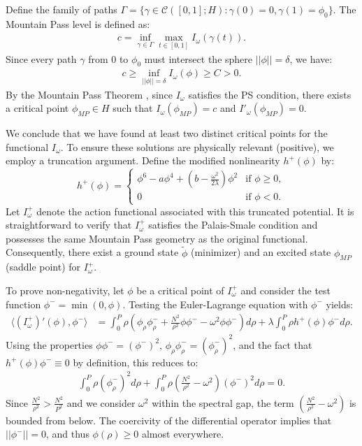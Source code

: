 \documentclass[12pt]{article}
\begin{document}
	Define the family of paths $\Gamma = \{ \gamma \in \mathcal{C}([0,1]; H) : \gamma(0)=0, \gamma(1)=\phi_0 \}$. The Mountain Pass level is defined as:
	\begin{align}
		c = \inf_{\gamma \in \Gamma} \max_{t \in [0,1]} I_\omega(\gamma(t)).
	\end{align}
	Since every path $\gamma$ from $0$ to $\phi_0$ must intersect the sphere $||\phi||=\delta$, we have:
	\begin{align}
		c \geq \inf_{||\phi||=\delta} I_\omega(\phi) \geq C > 0.
	\end{align}
	By the Mountain Pass Theorem \cite{Jabri, PR}, since $I_\omega$ satisfies the PS condition, there exists a critical point $\phi_{MP} \in H$ such that $I_\omega(\phi_{MP}) = c$ and $I'_\omega(\phi_{MP}) = 0$.
	
We conclude that we have found at least two distinct critical points for the functional $I_\omega$. To ensure these solutions are physically relevant (positive), we employ a truncation argument. Define the modified nonlinearity $h^+(\phi)$ by:
\begin{equation}
    h^+(\phi) = \begin{cases} 
    \phi^6 - a\phi^4 + (b - \frac{\omega^2}{2\lambda})\phi^2 & \text{if } \phi \geq 0, \\
    0 & \text{if } \phi < 0.
    \end{cases}
\end{equation}
Let $I_\omega^+$ denote the action functional associated with this truncated potential. It is straightforward to verify that $I_\omega^+$ satisfies the Palais-Smale condition and possesses the same Mountain Pass geometry as the original functional. Consequently, there exist a ground state $\tilde{\phi}$ (minimizer) and an excited state $\phi_{MP}$ (saddle point) for $I_\omega^+$.

To prove non-negativity, let $\phi$ be a critical point of $I_\omega^+$ and consider the test function $\phi^- = \min(0, \phi)$. Testing the Euler-Lagrange equation with $\phi^-$ yields:
\begin{align}
    \langle (I_\omega^+)'(\phi), \phi^- \rangle &= \int_0^P \rho \left( \phi_\rho \phi^-_\rho + \frac{N^2}{\rho^2}\phi\phi^- - \omega^2 \phi \phi^- \right) d\rho + \lambda \int_0^P \rho h^+(\phi) \phi^- d\rho.
\end{align}
Using the properties $\phi \phi^- = (\phi^-)^2$, $\phi_\rho \phi^-_\rho = (\phi^-_\rho)^2$, and the fact that $h^+(\phi)\phi^- \equiv 0$ by definition, this reduces to:
\begin{align}
    \int_0^P \rho (\phi^-_\rho)^2 d\rho + \int_0^P \rho \left( \frac{N^2}{\rho^2} - \omega^2 \right) (\phi^-)^2 d\rho = 0.
\end{align}
Since $\frac{N^2}{\rho^2} > \frac{N^2}{P^2}$ and we consider $\omega^2$ within the spectral gap, the term $(\frac{N^2}{\rho^2} - \omega^2)$ is bounded from below. The coercivity of the differential operator implies that $||\phi^-|| = 0$, and thus $\phi(\rho) \geq 0$ almost everywhere. 
\end{document}
